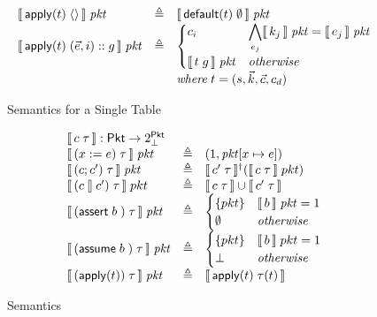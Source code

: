 \begin{figure}[ht]
  \[\begin{array}{lcl}
      \llbracket\,\mathsf{apply}(t)\; \langle\rangle\,\rrbracket\; \mathit{pkt}
      &\triangleq& \llbracket\,\mathsf{default}(t)\; \emptyset\,\rrbracket\; \mathit{pkt} \\
      \llbracket\,\mathsf{apply}(t)\; (\vec e, i)::g\,\rrbracket\; \mathit{pkt}
      &\triangleq& \begin{cases}
        c_i & \displaystyle \bigwedge_{e_j} \llbracket\,k_j\,\rrbracket\; \mathit{pkt} = \llbracket\,e_j\,\rrbracket\; \mathit{pkt} \\
        \llbracket\,t\; g\,\rrbracket\; \mathit{pkt} & \mathit{otherwise}
      \end{cases}\\
      && \mathit{where}\; t = (s, \vec k, \vec c, c_d)
    \end{array}\]
  \caption{Semantics for a Single Table}
  \label{fig:tablesemantics}
\end{figure}


\begin{figure}[ht]
  \[\begin{array}{lcl}
      \multicolumn 3 l {\bracbb{c\; \tau} : \Pkt \to 2^\Pkt_\bot} \\
      \bracbb{(x:=e)\; \tau}\; \pkt & \triangleq & (1,\pkt[x \mapsto e]) \\
      \bracbb{(c;c')\; \tau}\; \pkt & \triangleq & \bracbb{c'\; \tau}^\dag(\bracbb{c\; \tau}\; pkt) \\
      \bracbb{(c\angel c')\; \tau}\; pkt &\triangleq& \bracbb{c\; \tau} \cup \bracbb{c'\; \tau} \\
      \bracbb{(\assert b)\; \tau}\; \pkt &\triangleq& \begin{cases}
        \{pkt\}   & \bracbb{b}\; \pkt = \TRUE \\
        \emptyset & \mathit{otherwise}
      \end{cases} \\
      \bracbb{(\assume b)\; \tau}\; \pkt &\triangleq& \begin{cases}
        \{pkt\} & \bracbb{b}\; pkt = \TRUE \\
        \bot    & \mathit{otherwise}
      \end{cases} \\
      \bracbb{(\apply t)\; \tau}\; \pkt &\triangleq& \bracbb{\apply t\; \tau(t)}
    \end{array}\]
  
  \caption{Semantics}
  \label{fig:semantics}

\end{figure}

